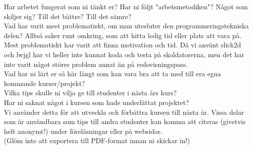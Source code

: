 Har arbetet fungerat som ni tänkt er? Har ni följt "arbetsmetodiken"? Något som skiljer sig? Till det bättre? Till det sämre?\\
Vad har varit mest problematiskt, om man utesluter den programmeringstekniska delen? Alltså saker runt omkring, som att hitta ledig tid eller plats att vara på.\\
Mest problematiskt har varit att finna motivation och tid. Då vi använt slick2d och lwjgl har vi heller inte kunnat koda och testa på skoldatorerna, men det har inte varit något större problem annat än på redovisningspass.\\
{\color{red}
Vad har ni lärt er så här långt som kan vara bra att ta med till era egna kommande kurser/projekt?\\
Vilka tips skulle ni vilja ge till studenter i nästa års kurs?\\
Har ni saknat något i kursen som hade underlättat projektet?\\
\vspace{11pt}
Vi använder detta för att utveckla och förbättra kursen till nästa år.  Vissa delar som är användbara som tips till andra studenter kan komma att citeras (givetvis helt anonymt!) under föreläsningar eller på websidor.\\
(Glöm inte att exportera till PDF-format innan ni skickar in!)\\
}
